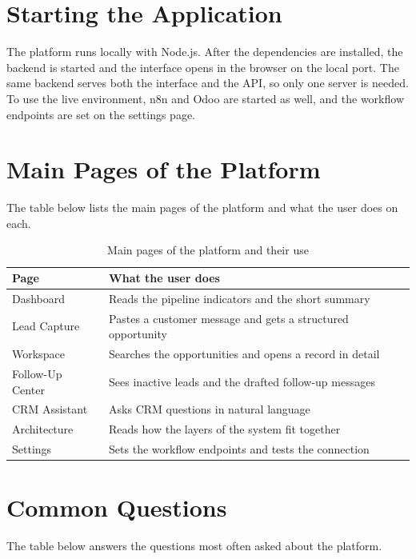 \documentclass[12pt,a4paper,oneside]{report}
\begin{document}
\section{Starting the Application}
The platform runs locally with Node.js. After the dependencies are installed, the backend is started and the interface opens in the browser on the local port. The same backend serves both the interface and the API, so only one server is needed. To use the live environment, n8n and Odoo are started as well, and the workflow endpoints are set on the settings page.

\section{Main Pages of the Platform}
The table below lists the main pages of the platform and what the user does on each.

\begin{table}[H]
\centering
\begin{tabularx}{\textwidth}{|p{3.6cm}|X|}
\hline\rowcolor{TabHead}
\textbf{Page} & \textbf{What the user does} \\
\hline
Dashboard & Reads the pipeline indicators and the short summary \\
\hline
Lead Capture & Pastes a customer message and gets a structured opportunity \\
\hline
Workspace & Searches the opportunities and opens a record in detail \\
\hline
Follow-Up Center & Sees inactive leads and the drafted follow-up messages \\
\hline
CRM Assistant & Asks CRM questions in natural language \\
\hline
Architecture & Reads how the layers of the system fit together \\
\hline
Settings & Sets the workflow endpoints and tests the connection \\
\hline
\end{tabularx}
\caption{Main pages of the platform and their use}
\end{table}

\section{Common Questions}
The table below answers the questions most often asked about the platform.
\end{document}
